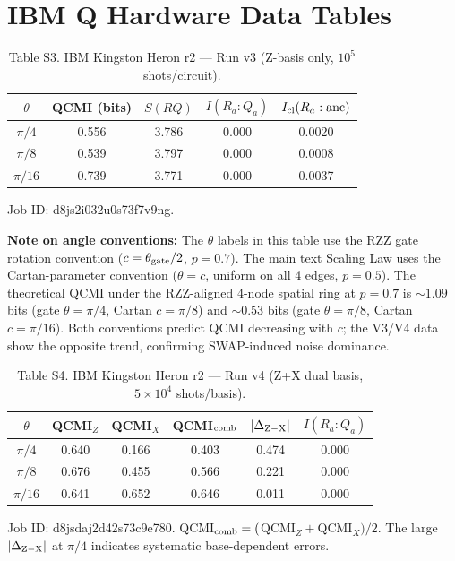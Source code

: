 \documentclass[aps,prl,showpacs]{revtex4-2}
\begin{document}
\newpage
\section{IBM Q Hardware Data Tables}

\begin{table}[ht]
\caption{Table S3. IBM Kingston Heron r2 — Run v3 (Z-basis only, $10^5$ shots/circuit).}
\begin{tabular}{c|c|c|c|c}
\hline
$\theta$ & QCMI (bits) & $S(RQ)$ & $I(R_a:Q_a)$ & $I_{\rm cl}(R_a:\mathrm{anc})$ \\
\hline
$\pi/4$ & 0.556 & 3.786 & 0.000 & 0.0020 \\
$\pi/8$ & 0.539 & 3.797 & 0.000 & 0.0008 \\
$\pi/16$ & 0.739 & 3.771 & 0.000 & 0.0037 \\
\hline
\end{tabular}

\vspace{4pt}
\noindent Job ID: d8js2i032u0s73f7v9ng.

\vspace{4pt}
\noindent\textbf{Note on angle conventions:} The $\theta$ labels in this table use the RZZ gate rotation convention ($c=\theta_{\rm gate}/2$, $p=0.7$). The main text Scaling Law uses the Cartan-parameter convention ($\theta=c$, uniform on all 4 edges, $p=0.5$). The theoretical QCMI under the RZZ-aligned 4-node spatial ring at $p=0.7$ is ${\sim}1.09$ bits (gate $\theta=\pi/4$, Cartan $c=\pi/8$) and ${\sim}0.53$ bits (gate $\theta=\pi/8$, Cartan $c=\pi/16$). Both conventions predict QCMI decreasing with $c$; the V3/V4 data show the opposite trend, confirming SWAP-induced noise dominance.
\end{table}

\begin{table}[ht]
\caption{Table S4. IBM Kingston Heron r2 — Run v4 (Z+X dual basis, $5\times10^4$ shots/basis).}
\begin{tabular}{c|c|c|c|c|c}
\hline
$\theta$ & QCMI$_Z$ & QCMI$_X$ & QCMI$_{\rm comb}$ & $|\Delta_{\rm Z-X}|$ & $I(R_a:Q_a)$ \\
\hline
$\pi/4$ & 0.640 & 0.166 & 0.403 & 0.474 & 0.000 \\
$\pi/8$ & 0.676 & 0.455 & 0.566 & 0.221 & 0.000 \\
$\pi/16$ & 0.641 & 0.652 & 0.646 & 0.011 & 0.000 \\
\hline
\end{tabular}

\vspace{4pt}
\noindent Job ID: d8jsdaj2d42s73c9e780. QCMI$_{\rm comb}=($QCMI$_Z+$QCMI$_X)/2$. The large $|\Delta_{\rm Z-X}|$ at $\pi/4$ indicates systematic base-dependent errors.
\end{table}
\end{document}
